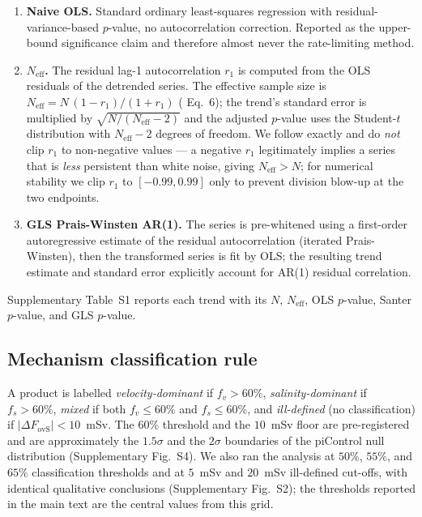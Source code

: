 \documentclass[12pt,a4paper]{article}
\newcommand{\Fovs}{F_\mathrm{ovS}}
\begin{document}
\begin{enumerate}

\item \textbf{Naive OLS.} Standard ordinary least-squares regression
  with residual-variance-based $p$-value, no autocorrelation
  correction. Reported as the upper-bound significance claim and
  therefore almost never the rate-limiting method.

\item \textbf{\citet{Santer2000} $N_\mathrm{eff}$.} The residual
  lag-1 autocorrelation $r_1$ is computed from the OLS residuals of
  the detrended series. The effective sample size is
  $N_\mathrm{eff} = N\,(1-r_1)/(1+r_1)$ (\citealp{Santer2000} Eq.~6);
  the trend's standard error is multiplied by
  $\sqrt{N/(N_\mathrm{eff}-2)}$ and the adjusted $p$-value uses the
  Student-$t$ distribution with $N_\mathrm{eff}-2$ degrees of
  freedom. We follow \citet{Santer2000} exactly and do \emph{not}
  clip $r_1$ to non-negative values --- a negative $r_1$
  legitimately implies a series that is \emph{less} persistent than
  white noise, giving $N_\mathrm{eff} > N$; for numerical stability
  we clip $r_1$ to $[-0.99, 0.99]$ only to prevent division blow-up
  at the two endpoints.

\item \textbf{GLS Prais-Winsten AR(1).} The series is pre-whitened
  using a first-order autoregressive estimate of the residual
  autocorrelation (iterated Prais-Winsten), then the transformed
  series is fit by OLS; the resulting trend estimate and standard
  error explicitly account for AR(1) residual correlation.

\end{enumerate}

Supplementary Table~S1 reports each trend with its $N$,
$N_\mathrm{eff}$, OLS $p$-value, Santer $p$-value, and GLS $p$-value.

\subsection*{Mechanism classification rule}

A product is labelled \emph{velocity-dominant} if
$f_v > 60\%$, \emph{salinity-dominant} if $f_s > 60\%$,
\emph{mixed} if both $f_v \le 60\%$ and $f_s \le 60\%$,
and \emph{ill-defined} (no classification) if $|\Delta\Fovs|
< 10$~mSv. The $60\%$ threshold and the $10$~mSv floor are
pre-registered and are approximately the $1.5\sigma$ and the $2\sigma$
boundaries of the piControl null distribution (Supplementary
Fig.~S4). We also ran the analysis at $50\%$, $55\%$, and $65\%$
classification thresholds and at $5$~mSv and $20$~mSv ill-defined
cut-offs, with identical qualitative conclusions
(Supplementary Fig.~S2); the thresholds reported in the main text are
the central values from this grid.
\end{document}

